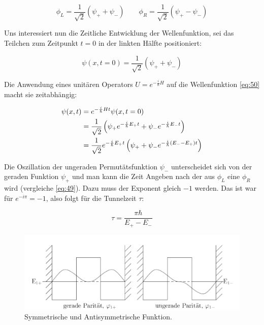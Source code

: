 \begin{equation}
  \label{eq:49}
  \phi_L = \frac{1}{\sqrt{2}}(\psi_+ + \psi_-) \qquad  \phi_R = \frac{1}{\sqrt{2}}(\psi_+ - \psi_-) 
\end{equation}

Uns interessiert nun die Zeitliche Entwicklung der Wellenfunktion, sei das Teilchen zum Zeitpunkt \(t=0\) in der linkten Hälfte positioniert:

\begin{equation}
  \label{eq:50}
  \psi(x,t=0) = \frac{1}{\sqrt{2}}(\psi_+ + \psi_-)
\end{equation}

Die Anwendung eines unitären Operators \(U=e^{-\frac{i}{\hbar}H}\) auf die Wellenfunktion \eqref{eq:50} macht sie zeitabhängig:

\begin{align}
  \label{eq:51}
  \psi(x,t) &= e^{-\frac{i}{\hbar}Ht}\psi(x,t=0) \notag \\
&= \frac{1}{\sqrt{2}}\left(\psi_+e^{-\frac{i}{\hbar}E_+t} + \psi_-e^{-\frac{i}{\hbar}E_-t}\right)  \notag\\
&= \frac{1}{\sqrt{2}}e^{-\frac{i}{\hbar}E_+t}\left(\psi_+ + \psi_-e^{-\frac{i}{\hbar}(E_--E_+)t}\right) 
\end{align}

Die Oszillation der ungeraden Permutätsfunktion \(\psi_-\) unterscheidet sich von der geraden Funktion \(\psi_+\) und man kann die Zeit Angeben nach der aus \(\phi_L\) eine \(\phi_R\) wird (vergleiche \eqref{eq:49}). Dazu muss der Exponent gleich \(-1\) werden. Das ist war für \(e^{-i\pi} = -1\), also folgt für die Tunnelzeit \(\tau\):

\begin{equation}
  \label{eq:52}
  \tau = \frac{\pi\hbar}{E_+-E_-}
\end{equation}


\begin{figure}[htbp]
  \centering
  \includegraphics{./sgl_doppelmuldenpotential_pics/pic02_v.pdf}
  \caption{Symmetrische und Antisymmetrische Funktion.}
  \label{fig:fg2}
\end{figure}


